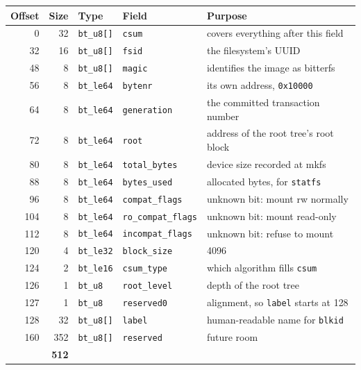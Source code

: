 \begin{center}
\begin{tabular}{rrllp{5.4cm}}
  \toprule
  Offset & Size & Type & Field & Purpose \\
  \midrule
  0   & 32  & \texttt{bt\_u8[]} & \texttt{csum}            & covers everything after this field \\
  32  & 16  & \texttt{bt\_u8[]} & \texttt{fsid}            & the filesystem's UUID \\
  48  & 8   & \texttt{bt\_u8[]} & \texttt{magic}           & identifies the image as bitterfs \\
  56  & 8   & \texttt{bt\_le64} & \texttt{bytenr}          & its own address, \texttt{0x10000} \\
  64  & 8   & \texttt{bt\_le64} & \texttt{generation}      & the committed transaction number \\
  72  & 8   & \texttt{bt\_le64} & \texttt{root}            & address of the root tree's root block \\
  80  & 8   & \texttt{bt\_le64} & \texttt{total\_bytes}    & device size recorded at mkfs \\
  88  & 8   & \texttt{bt\_le64} & \texttt{bytes\_used}     & allocated bytes, for \texttt{statfs} \\
  96  & 8   & \texttt{bt\_le64} & \texttt{compat\_flags}   & unknown bit: mount rw normally \\
  104 & 8   & \texttt{bt\_le64} & \texttt{ro\_compat\_flags} & unknown bit: mount read-only \\
  112 & 8   & \texttt{bt\_le64} & \texttt{incompat\_flags} & unknown bit: refuse to mount \\
  120 & 4   & \texttt{bt\_le32} & \texttt{block\_size}     & 4096 \\
  124 & 2   & \texttt{bt\_le16} & \texttt{csum\_type}      & which algorithm fills \texttt{csum} \\
  126 & 1   & \texttt{bt\_u8}   & \texttt{root\_level}     & depth of the root tree \\
  127 & 1   & \texttt{bt\_u8}   & \texttt{reserved0}       & alignment, so \texttt{label} starts at 128 \\
  128 & 32  & \texttt{bt\_u8[]} & \texttt{label}           & human-readable name for \texttt{blkid} \\
  160 & 352 & \texttt{bt\_u8[]} & \texttt{reserved}        & future room \\
  \midrule
  \multicolumn{2}{r}{\textbf{512}} & & & \\
  \bottomrule
\end{tabular}
\end{center}

